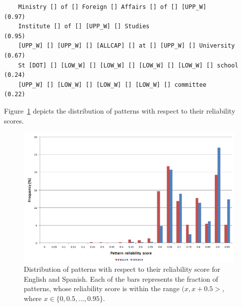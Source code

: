 \documentclass[output=paper]{langsci/langscibook}
\begin{document}
{\small
\begin{verbatim}
    Ministry [] of [] Foreign [] Affairs [] of [] [UPP_W]          (0.97)
    Institute [] of [] [UPP_W] [] Studies                          (0.95)
    [UPP_W] [] [UPP_W] [] [ALLCAP] [] at [] [UPP_W] [] University  (0.67)
    St [DOT] [] [LOW_W] [] [LOW_W] [] [LOW_W] [] [LOW_W] [] school (0.24)
    [UPP_W] [] [LOW_W] [] [LOW_W] [] [LOW_W] [] committee          (0.22)
\end{verbatim}
}

Figure~\ref{jac:pattern-distr} depicts the distribution of patterns with
respect to their reliability scores.

\begin{figure}
\centering
\includegraphics[width=.95\textwidth]{figures/patterns-distr.png}
\caption{\label{jac:pattern-distr}Distribution of patterns with respect to their reliability score for English and Spanish. Each of the bars represents the fraction of patterns, whose reliability score is within the range $(x,x+0.5>$, where $x \in \{0,0.5,...,0.95\}$.}
\end{figure}
\end{document}
